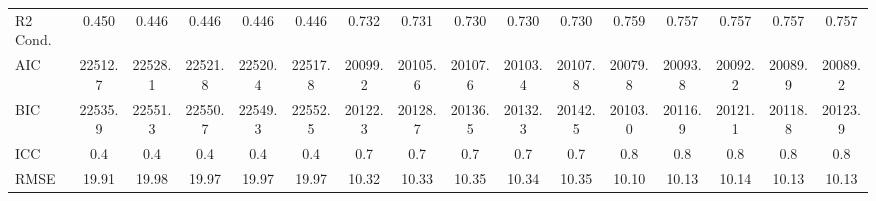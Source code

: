 \documentclass[]{report}
\begin{document}
\begin{table}
{\begin{tabular}[t]{lccccccccccccccc}
		R2 Cond. & \num{0.450} & \num{0.446} & \num{0.446} & \num{0.446} & \num{0.446} & \num{0.732} & \num{0.731} & \num{0.730} & \num{0.730} & \num{0.730} & \num{0.759} & \num{0.757} & \num{0.757} & \num{0.757} & \num{0.757}\\
		AIC & \num{22512.7} & \num{22528.1} & \num{22521.8} & \num{22520.4} & \num{22517.8} & \num{20099.2} & \num{20105.6} & \num{20107.6} & \num{20103.4} & \num{20107.8} & \num{20079.8} & \num{20093.8} & \num{20092.2} & \num{20089.9} & \num{20089.2}\\
		BIC & \num{22535.9} & \num{22551.3} & \num{22550.7} & \num{22549.3} & \num{22552.5} & \num{20122.3} & \num{20128.7} & \num{20136.5} & \num{20132.3} & \num{20142.5} & \num{20103.0} & \num{20116.9} & \num{20121.1} & \num{20118.8} & \num{20123.9}\\
		ICC & \num{0.4} & \num{0.4} & \num{0.4} & \num{0.4} & \num{0.4} & \num{0.7} & \num{0.7} & \num{0.7} & \num{0.7} & \num{0.7} & \num{0.8} & \num{0.8} & \num{0.8} & \num{0.8} & \num{0.8}\\
		RMSE & \num{19.91} & \num{19.98} & \num{19.97} & \num{19.97} & \num{19.97} & \num{10.32} & \num{10.33} & \num{10.35} & \num{10.34} & \num{10.35} & \num{10.10} & \num{10.13} & \num{10.14} & \num{10.13} & \num{10.13}\\
		\bottomrule
	\end{tabular}}
\end{table}
\end{document}
